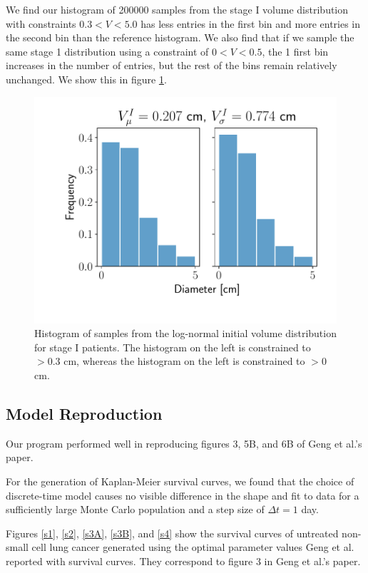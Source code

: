 \documentclass[letterpaper
, superscriptaddress
, twocolumn
, aps
]{revtex4}
\begin{document}
We find our histogram of 200000 samples from the stage I volume distribution with constraints $ 0.3 < V < 5.0$ has less entries in the first bin and more entries in the second bin than the reference histogram. We also find that if we sample the same stage 1 distribution using a constraint of $0 < V < 0.5$, the 1 first bin increases in the number of entries, but the rest of the bins remain relatively unchanged. We show this in figure \ref{volume_hist}.
\begin{figure}[h!]
	\includegraphics[width=1.00\columnwidth]{Figures/vd1.pdf}
	\caption{Histogram of samples from the log-normal initial volume distribution for stage I patients. The histogram on the left is constrained to $> 0.3$ cm, whereas the histogram on the left is constrained to $> 0$ cm.}
	\label{volume_hist}
\end{figure}


\subsection{Model Reproduction}
Our program performed well in reproducing figures 3, 5B, and 6B of Geng et al.'s paper.

For the generation of Kaplan-Meier survival curves, we found that the choice of discrete-time model causes no visible difference in the shape and fit to data for a sufficiently large Monte Carlo population and a step size of $\Delta t = 1$ day.

Figures \ref{s1}, \ref{s2}, \ref{s3A}, \ref{s3B}, and \ref{s4} show the survival curves of untreated non-small cell lung cancer generated using the optimal parameter values Geng et al. reported with survival curves. They correspond to figure 3 in Geng et al.'s paper.
\end{document}
